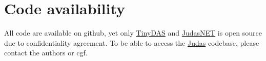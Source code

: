 \section{Code availability}

All code are available on github, yet only \href{https://github.com/Jafagervik/TinyDAS}{TinyDAS} and \href{https://github.com/Jafagervik/JudasNET}{JudasNET} is open source due to confidentiality agreement. To be able to access the \href{https://github.com/Jafagervik/Judas}{Judas} codebase, please contact the authors or \acrshort{cgf}.